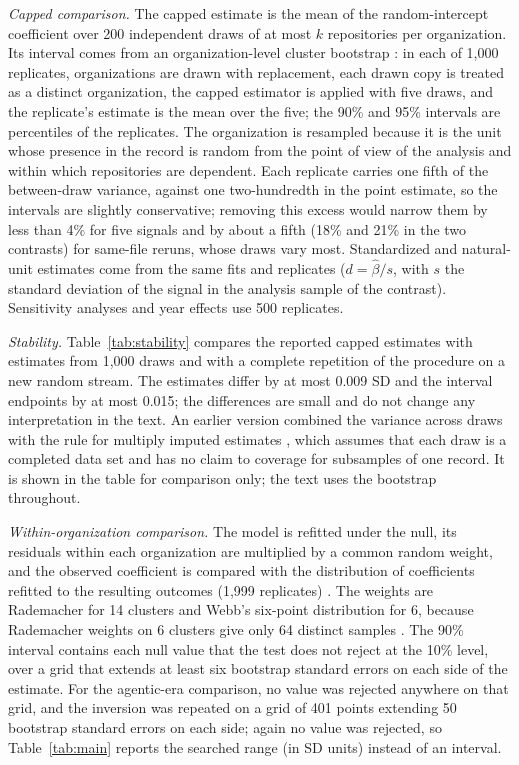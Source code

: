\documentclass[acmsmall,screen,review,anonymous]{acmart}
\begin{document}
\textit{Capped comparison.} The capped estimate is the mean of the random-intercept coefficient over 200 independent draws of at most $k$ repositories per organization. Its interval comes from an organization-level cluster bootstrap \citep{cameron2008bootstrap, cameron2015practitioner}: in each of 1,000 replicates, organizations are drawn with replacement, each drawn copy is treated as a distinct organization, the capped estimator is applied with five draws, and the replicate's estimate is the mean over the five; the 90\% and 95\% intervals are percentiles of the replicates. The organization is resampled because it is the unit whose presence in the record is random from the point of view of the analysis and within which repositories are dependent. Each replicate carries one fifth of the between-draw variance, against one two-hundredth in the point estimate, so the intervals are slightly conservative; removing this excess would narrow them by less than 4\% for five signals and by about a fifth (18\% and 21\% in the two contrasts) for same-file reruns, whose draws vary most. Standardized and natural-unit estimates come from the same fits and replicates ($d = \hat\beta / s$, with $s$ the standard deviation of the signal in the analysis sample of the contrast). Sensitivity analyses and year effects use 500 replicates.

\textit{Stability.} Table~\ref{tab:stability} compares the reported capped estimates with estimates from 1,000 draws and with a complete repetition of the procedure on a new random stream. The estimates differ by at most 0.009 SD and the interval endpoints by at most 0.015; the differences are small and do not change any interpretation in the text. An earlier version combined the variance across draws with the rule for multiply imputed estimates \citep{rubin1987imputation}, which assumes that each draw is a completed data set and has no claim to coverage for subsamples of one record. It is shown in the table for comparison only; the text uses the bootstrap throughout.



\textit{Within-organization comparison.} The model is refitted under the null, its residuals within each organization are multiplied by a common random weight, and the observed coefficient is compared with the distribution of coefficients refitted to the resulting outcomes (1,999 replicates) \citep{roodman2019boottest}. The weights are Rademacher for 14 clusters and Webb's six-point distribution for 6, because Rademacher weights on 6 clusters give only 64 distinct samples \citep{webb2023reworking}. The 90\% interval contains each null value that the test does not reject at the 10\% level, over a grid that extends at least six bootstrap standard errors on each side of the estimate. For the agentic-era comparison, no value was rejected anywhere on that grid, and the inversion was repeated on a grid of 401 points extending 50 bootstrap standard errors on each side; again no value was rejected, so Table~\ref{tab:main} reports the searched range (in SD units) instead of an interval.
\end{document}
